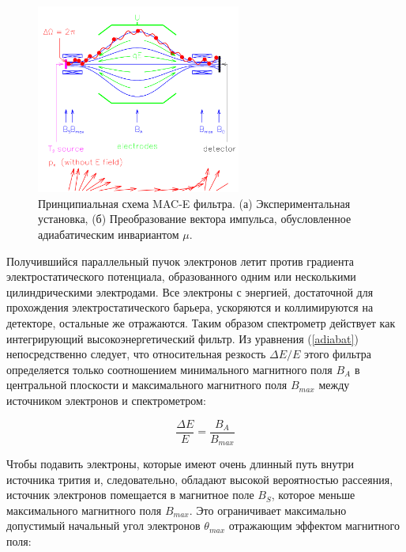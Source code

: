 \documentclass[a4paper,14pt]{extarticle}
\begin{document}
    \begin{figure}
        \center
        \includegraphics[width=0.6\textwidth]{spectrometer.png}
        \captionsetup{width=0.8\textwidth}
        \caption{Принципиальная схема MAC-E фильтра. (а) Экспериментальная установка, (б) Преобразование вектора импульса, обусловленное адиабатическим инвариантом $\mu$.}
        \label{fig:spectrometer}
    \end{figure}
    
    Получившийся параллельный пучок электронов летит против градиента электростатического потенциала, образованного
    одним или несколькими цилиндрическими электродами. Все электроны с энергией, достаточной для прохождения
    электростатического барьера, ускоряются и коллимируются на детекторе, остальные же отражаются.
    Таким образом спектрометр действует как интегрирующий высокоэнергетический фильтр. Из уравнения (\ref{adiabat})
    непосредственно следует, что относительная резкость $\Delta E/E$ этого фильтра определяется только соотношением
    минимального магнитного поля $B_A$ в центральной плоскости и максимального магнитного поля
    $B_{max}$ между источником электронов и спектрометром:
    
    \begin{equation}
        \label{form2}
        \frac{\Delta E}{E} = \frac{B_A}{B_{max}}
    \end{equation}
    
    Чтобы подавить электроны, которые имеют очень длинный путь внутри источника трития
    и, следовательно, обладают высокой вероятностью рассеяния, источник электронов помещается в
    магнитное поле $B_S$, которое меньше максимального магнитного поля $B_{max}$.
    Это ограничивает максимально допустимый начальный угол электронов $\theta_{max}$ 
    отражающим эффектом магнитного поля:
    
\end{document}

